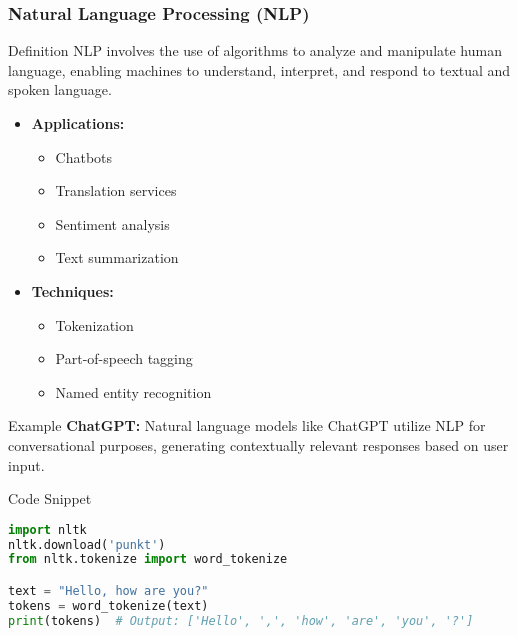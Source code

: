 \documentclass[aspectratio=169]{beamer}
\begin{document}
\begin{frame}
    \frametitle{Natural Language Processing (NLP)}
    \begin{block}{Definition}
        NLP involves the use of algorithms to analyze and manipulate human language, enabling machines to understand, interpret, and respond to textual and spoken language.
    \end{block}
    
    \begin{itemize}
        \item \textbf{Applications:}
            \begin{itemize}
                \item Chatbots
                \item Translation services
                \item Sentiment analysis
                \item Text summarization
            \end{itemize}
        \item \textbf{Techniques:} 
            \begin{itemize}
                \item Tokenization
                \item Part-of-speech tagging
                \item Named entity recognition
            \end{itemize}
    \end{itemize}
    
    \begin{block}{Example}
        \textbf{ChatGPT:} Natural language models like ChatGPT utilize NLP for conversational purposes, generating contextually relevant responses based on user input.
    \end{block}
    
    \begin{block}{Code Snippet}
    \begin{lstlisting}[language=Python]
import nltk
nltk.download('punkt')
from nltk.tokenize import word_tokenize

text = "Hello, how are you?"
tokens = word_tokenize(text)
print(tokens)  # Output: ['Hello', ',', 'how', 'are', 'you', '?']
    \end{lstlisting}
    \end{block}
\end{frame}
\end{document}
